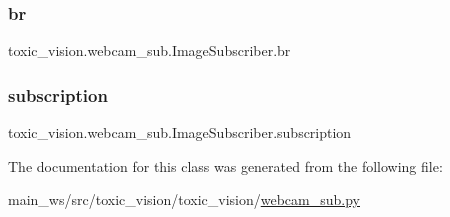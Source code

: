 \subsubsection{\texorpdfstring{br}{br}}
{\footnotesize\ttfamily toxic\+\_\+vision.\+webcam\+\_\+sub.\+Image\+Subscriber.\+br}

\mbox{\label{classtoxic__vision_1_1webcam__sub_1_1ImageSubscriber_acafc58605e5f56862a1d83c4dfb5bf8a}} 
\subsubsection{\texorpdfstring{subscription}{subscription}}
{\footnotesize\ttfamily toxic\+\_\+vision.\+webcam\+\_\+sub.\+Image\+Subscriber.\+subscription}



The documentation for this class was generated from the following file\+:\begin{DoxyCompactItemize}
\item 
main\+\_\+ws/src/toxic\+\_\+vision/toxic\+\_\+vision/\mbox{\hyperlink{webcam__sub_8py}{webcam\+\_\+sub.\+py}}\end{DoxyCompactItemize}
